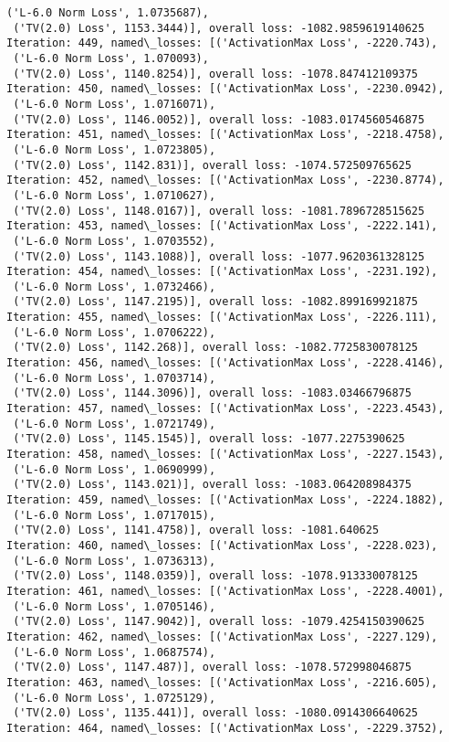 \documentclass[10pt]{article}
\begin{document}
\begin{Verbatim}[commandchars=\\\{\}]
 ('L-6.0 Norm Loss', 1.0735687),
 ('TV(2.0) Loss', 1153.3444)], overall loss: -1082.9859619140625
Iteration: 449, named\_losses: [('ActivationMax Loss', -2220.743),
 ('L-6.0 Norm Loss', 1.070093),
 ('TV(2.0) Loss', 1140.8254)], overall loss: -1078.847412109375
Iteration: 450, named\_losses: [('ActivationMax Loss', -2230.0942),
 ('L-6.0 Norm Loss', 1.0716071),
 ('TV(2.0) Loss', 1146.0052)], overall loss: -1083.0174560546875
Iteration: 451, named\_losses: [('ActivationMax Loss', -2218.4758),
 ('L-6.0 Norm Loss', 1.0723805),
 ('TV(2.0) Loss', 1142.831)], overall loss: -1074.572509765625
Iteration: 452, named\_losses: [('ActivationMax Loss', -2230.8774),
 ('L-6.0 Norm Loss', 1.0710627),
 ('TV(2.0) Loss', 1148.0167)], overall loss: -1081.7896728515625
Iteration: 453, named\_losses: [('ActivationMax Loss', -2222.141),
 ('L-6.0 Norm Loss', 1.0703552),
 ('TV(2.0) Loss', 1143.1088)], overall loss: -1077.9620361328125
Iteration: 454, named\_losses: [('ActivationMax Loss', -2231.192),
 ('L-6.0 Norm Loss', 1.0732466),
 ('TV(2.0) Loss', 1147.2195)], overall loss: -1082.899169921875
Iteration: 455, named\_losses: [('ActivationMax Loss', -2226.111),
 ('L-6.0 Norm Loss', 1.0706222),
 ('TV(2.0) Loss', 1142.268)], overall loss: -1082.7725830078125
Iteration: 456, named\_losses: [('ActivationMax Loss', -2228.4146),
 ('L-6.0 Norm Loss', 1.0703714),
 ('TV(2.0) Loss', 1144.3096)], overall loss: -1083.03466796875
Iteration: 457, named\_losses: [('ActivationMax Loss', -2223.4543),
 ('L-6.0 Norm Loss', 1.0721749),
 ('TV(2.0) Loss', 1145.1545)], overall loss: -1077.2275390625
Iteration: 458, named\_losses: [('ActivationMax Loss', -2227.1543),
 ('L-6.0 Norm Loss', 1.0690999),
 ('TV(2.0) Loss', 1143.021)], overall loss: -1083.064208984375
Iteration: 459, named\_losses: [('ActivationMax Loss', -2224.1882),
 ('L-6.0 Norm Loss', 1.0717015),
 ('TV(2.0) Loss', 1141.4758)], overall loss: -1081.640625
Iteration: 460, named\_losses: [('ActivationMax Loss', -2228.023),
 ('L-6.0 Norm Loss', 1.0736313),
 ('TV(2.0) Loss', 1148.0359)], overall loss: -1078.913330078125
Iteration: 461, named\_losses: [('ActivationMax Loss', -2228.4001),
 ('L-6.0 Norm Loss', 1.0705146),
 ('TV(2.0) Loss', 1147.9042)], overall loss: -1079.4254150390625
Iteration: 462, named\_losses: [('ActivationMax Loss', -2227.129),
 ('L-6.0 Norm Loss', 1.0687574),
 ('TV(2.0) Loss', 1147.487)], overall loss: -1078.572998046875
Iteration: 463, named\_losses: [('ActivationMax Loss', -2216.605),
 ('L-6.0 Norm Loss', 1.0725129),
 ('TV(2.0) Loss', 1135.441)], overall loss: -1080.0914306640625
Iteration: 464, named\_losses: [('ActivationMax Loss', -2229.3752),

\end{Verbatim}
\end{document}
